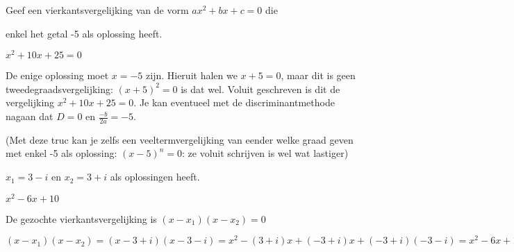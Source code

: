 \documentclass{ximera}
\begin{document}
	\begin{exercise}
	\begin{statement}
		Geef een vierkantsvergelijking van de vorm $ax^2 + bx + c = 0$ die
	\end{statement}
	\begin{question}
		enkel het getal -5 als oplossing heeft.
		\begin{uitkomst} $x^2 +10 x + 25 = 0$
		\end{uitkomst}
					\begin{oplossing}
						De enige oplossing moet $x = -5$ zijn. Hieruit halen we $x + 5 = 0$, maar dit is geen tweedegraadsvergelijking: $(x+5)^2 = 0$ is dat wel. Voluit geschreven is dit de vergelijking $x^2 +10 x + 25 = 0$. Je kan eventueel met de discriminantmethode nagaan dat $D = 0$ en $\frac{-b}{2a} = -5$.
						
						(Met deze truc kan je zelfs een veeltermvergelijking van eender welke graad geven met enkel -5 als oplossing: $(x-5)^n = 0$: ze voluit schrijven is wel wat lastiger)
					\end{oplossing}
	\end{question}
	
	\begin{question}
		$x_1 = 3-i$ en $x_2 = 3+i$ als oplossingen heeft.
		\begin{uitkomst} $x^2-6x+10$
		\end{uitkomst}
					\begin{hint}De gezochte vierkantsvergelijking is $(x-x_1)(x-x_2)=0$ \end{hint}
					\begin{oplossing}
						$(x-x_1)(x-x_2)=(x-3+i)(x-3-i)=x^2 -(3+i)x+(-3+i)x+(-3+i)(-3-i)=x^2-6x+10$
					\end{oplossing}
	\end{question}
\end{exercise}
\end{document}
